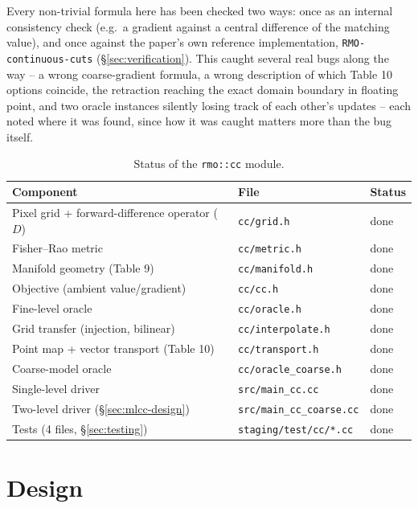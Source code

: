 \documentclass[11pt]{article}
\begin{document}
Every non-trivial formula here has been checked two ways: once as an internal consistency
check (e.g.\ a gradient against a central difference of the matching value), and once
against the paper's own reference implementation, \texttt{RMO-continuous-cuts}
(\S\ref{sec:verification}). This caught several real bugs along the way -- a wrong
coarse-gradient formula, a wrong description of which Table 10 options coincide, the
retraction reaching the exact domain boundary in floating point, and two oracle instances
silently losing track of each other's updates -- each noted where it was found, since how
it was caught matters more than the bug itself.

\begin{table}[h]
\centering
\begin{tabular}{@{}lll@{}}
\toprule
Component & File & Status \\
\midrule
Pixel grid + forward-difference operator ($D$)   & \texttt{cc/grid.h}            & done \\
Fisher--Rao metric                               & \texttt{cc/metric.h}          & done \\
Manifold geometry (Table 9)                      & \texttt{cc/manifold.h}        & done \\
Objective (ambient value/gradient)               & \texttt{cc/cc.h}              & done \\
Fine-level oracle                                & \texttt{cc/oracle.h}          & done \\
Grid transfer (injection, bilinear)              & \texttt{cc/interpolate.h}     & done \\
Point map + vector transport (Table 10)          & \texttt{cc/transport.h}       & done \\
Coarse-model oracle                              & \texttt{cc/oracle\_coarse.h}  & done \\
Single-level driver                              & \texttt{src/main\_cc.cc}      & done \\
Two-level driver (\S\ref{sec:mlcc-design})       & \texttt{src/main\_cc\_coarse.cc} & done \\
Tests (4 files, \S\ref{sec:testing})             & \texttt{staging/test/cc/*.cc}         & done \\
\bottomrule
\end{tabular}
\caption{Status of the \texttt{rmo::cc} module.}
\label{tab:status}
\end{table}

\section{Design}
\end{document}
